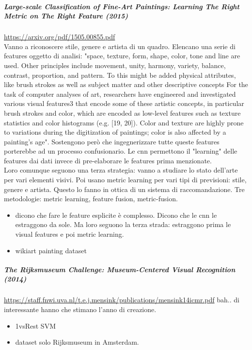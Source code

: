 \documentclass{article}
\begin{document}
\subparagraph{Large-scale Classification of Fine-Art Paintings:
	Learning The Right Metric on The Right Feature (2015)}
\url{https://arxiv.org/pdf/1505.00855.pdf}\\
Vanno a riconoscere stile, genere e artista di un quadro. Elencano una serie di features oggetto di analisi: "space, texture, form, shape, color, tone and line are used. Other principles include movement, unity, harmony, variety, balance, contrast, proportion, and pattern. To
this might be added physical attributes, like brush strokes as well as subject matter and
other descriptive concepts For the task of computer analyses of art, researchers have engineered and investigated various visual features3
that encode some of these artistic concepts, in particular
brush strokes and color, which are encoded as low-level features such as texture statistics and color histograms (e.g. [19, 20]). Color and texture are highly prone to variations during the digitization of paintings; color is also affected by a painting’s age". Sostengono però che ingegnerizzare tutte queste features porterebbe ad un processo confusionario.  Le cnn permettono il "learning" delle features dai dati invece di pre-elaborare le features prima menzionate.\\ Loro comunque seguono una terza strategia: vanno a studiare lo stato dell'arte per vari elementi visivi. Poi usano metric learning  per vari tipi di previsioni: stile, genere e artista. Questo lo fanno in ottica di un sistema di raccomandazione. Tre metodologie: metric learning, feature fusion, metric-fusion.

\begin{itemize}
	\item dicono che fare le feature esplicite è complesso. Dicono che le cnn le estraggono da sole. Ma loro seguono la terza strada: estraggono prima le visual features e poi metric learning.
	\item wikiart painting dataset
\end{itemize}

\subparagraph{The Rijksmuseum Challenge:
	Museum-Centered Visual Recognition (2014)}
\url{https://staff.fnwi.uva.nl/t.e.j.mensink/publications/mensink14icmr.pdf} bah.. di interessante hanno che stimano l'anno di creazione.

\begin{itemize}
	\item 1vsRest SVM
	\item dataset solo Rijksmuseum in Amsterdam.
	
\end{itemize}
\end{document}
